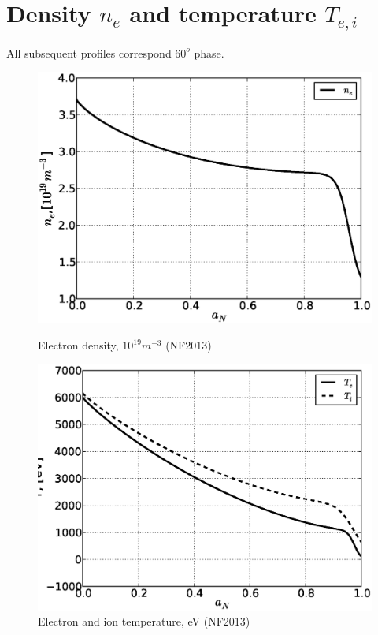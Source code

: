 \documentclass[11pt,oneside,a4paper,notitlepage]{article}
\begin{document}
\section{Density $n_e$ and temperature $T_{e,i}$}
All subsequent profiles correspond $60^o$ phase.
\begin{figure}[h]
\begin{center}
\begin{minipage}[h]{0.4\linewidth} 
 \centering
 \includegraphics[width=1.35\linewidth]{evans60/ne60.eps}
 \caption{Electron density, $10^{19} m^{-3}$ (NF2013)}
 \label{fig:ne60}
\end{minipage}
\hfill
\begin{minipage}[h]{0.4\linewidth}
 \centering
 \includegraphics[width=1.35\linewidth]{evans60/T60.eps}
 \caption{Electron and ion temperature, eV (NF2013)}
 \label{fig:T60}
\end{minipage}
\end{center}
\end{figure}
\end{document}
